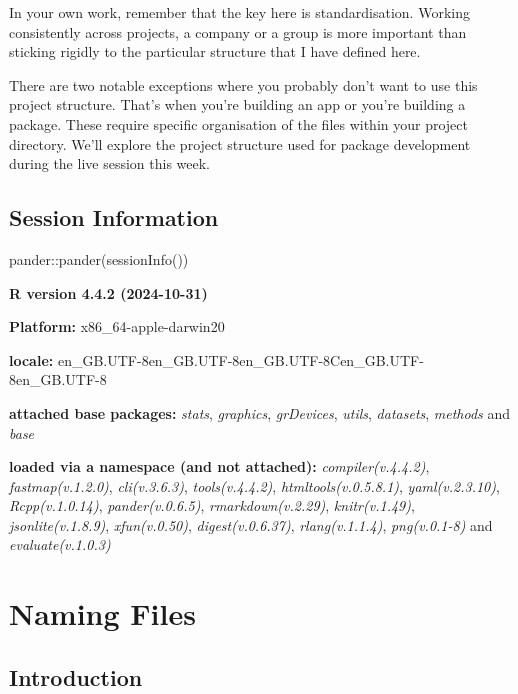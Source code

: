\documentclass[
  letterpaper,
  DIV=11,
  numbers=noendperiod]{scrreprt}
\newenvironment{Shaded}{\begin{snugshade}}{\end{snugshade}}
\newcommand{\FunctionTok}[1]{\textcolor[rgb]{0.28,0.35,0.67}{#1}}
\newcommand{\NormalTok}[1]{\textcolor[rgb]{0.00,0.23,0.31}{#1}}
\newcommand{\SpecialCharTok}[1]{\textcolor[rgb]{0.37,0.37,0.37}{#1}}
\begin{document}
In your own work, remember that the key here is standardisation. Working
consistently across projects, a company or a group is more important
than sticking rigidly to the particular structure that I have defined
here.

There are two notable exceptions where you probably don't want to use
this project structure. That's when you're building an app or you're
building a package. These require specific organisation of the files
within your project directory. We'll explore the project structure used
for package development during the live session this week.

\section{Session Information}\label{session-information}

\begin{Shaded}
\begin{Highlighting}[]
\NormalTok{pander}\SpecialCharTok{::}\FunctionTok{pander}\NormalTok{(}\FunctionTok{sessionInfo}\NormalTok{())}
\end{Highlighting}
\end{Shaded}

\textbf{R version 4.4.2 (2024-10-31)}

\textbf{Platform:} x86\_64-apple-darwin20

\textbf{locale:}
en\_GB.UTF-8\textbar\textbar en\_GB.UTF-8\textbar\textbar en\_GB.UTF-8\textbar\textbar C\textbar\textbar en\_GB.UTF-8\textbar\textbar en\_GB.UTF-8

\textbf{attached base packages:} \emph{stats}, \emph{graphics},
\emph{grDevices}, \emph{utils}, \emph{datasets}, \emph{methods} and
\emph{base}

\textbf{loaded via a namespace (and not attached):}
\emph{compiler(v.4.4.2)}, \emph{fastmap(v.1.2.0)}, \emph{cli(v.3.6.3)},
\emph{tools(v.4.4.2)}, \emph{htmltools(v.0.5.8.1)},
\emph{yaml(v.2.3.10)}, \emph{Rcpp(v.1.0.14)}, \emph{pander(v.0.6.5)},
\emph{rmarkdown(v.2.29)}, \emph{knitr(v.1.49)},
\emph{jsonlite(v.1.8.9)}, \emph{xfun(v.0.50)}, \emph{digest(v.0.6.37)},
\emph{rlang(v.1.1.4)}, \emph{png(v.0.1-8)} and \emph{evaluate(v.1.0.3)}

\chapter{Naming Files}\label{workflows-naming}

\section{Introduction}\label{introduction-1}
\end{document}

